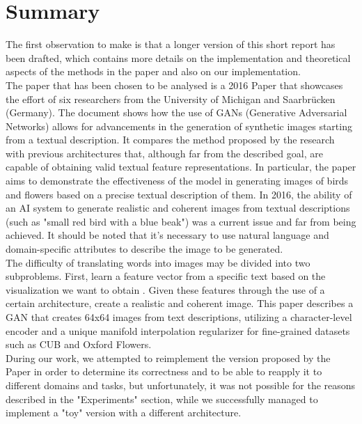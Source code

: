 \section*{Summary}
The first observation to make is that a longer version of this short report 
has been drafted, which contains more details on the implementation and 
theoretical aspects of the methods in the paper and also on our 
implementation. \\
The paper that has been chosen to be analysed is a 2016 Paper  
that showcases the effort of six researchers from the University of 
Michigan and Saarbrücken (Germany). 
The document shows how the use of GANs (Generative Adversarial Networks) 
allows for advancements in the generation of synthetic images starting 
from a textual description. 
It compares the method proposed by the research with previous architectures
that, although far from the described goal, are capable of obtaining 
valid textual feature representations. 
In particular, the paper aims to demonstrate the effectiveness of 
the model in generating images of birds and flowers based on a precise 
textual description of them.
In 2016, the ability of an AI system to generate realistic and 
coherent images from textual descriptions 
(such as "small red bird with a blue beak") was a current issue and 
far from being achieved.
It should be noted that it's necessary to use natural language 
and domain-specific attributes to describe the image to be generated.
\\
The difficulty of translating words into images may be 
divided into two subproblems.
First, learn a feature vector from a specific text 
based on the visualization we want to obtain .
Given these features through the use of a certain architecture, 
create a realistic and coherent image.
This paper describes a GAN that creates 64x64 images from text descriptions, 
utilizing a character-level encoder and a unique manifold interpolation regularizer 
for fine-grained datasets such as CUB and Oxford Flowers.
\\
During our work, we attempted to reimplement the version proposed by the Paper in order 
to determine its correctness and to be able to reapply it to different domains and tasks, 
but unfortunately, it was not possible for the reasons described in the "Experiments" section, 
while we successfully managed to implement a "toy" version with a different architecture.